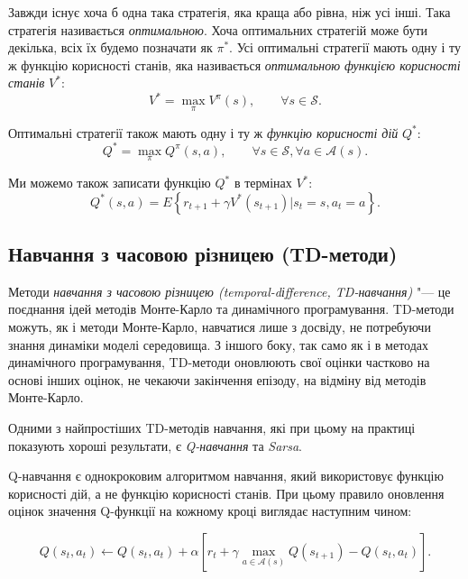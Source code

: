 \documentclass[a4paper,10pt,fleqn]{article}
\begin{document}
Завжди існує хоча б одна така стратегія, яка краща або рівна, ніж усі інші. Така стратегія називається \emph{оптимальною}. Хоча оптимальних стратегій може бути декілька, всіх їх будемо позначати як $\pi^*$. Усі оптимальні стратегії мають одну і ту ж функцію корисності станів, яка називається \emph{оптимальною функцією корисності станів} $V^*$:
\begin{equation}
V^* = \max_\pi V^\pi(s),\qquad \forall s \in \mathcal{S}.
\end{equation}

Оптимальні стратегії також мають одну і ту ж \emph{функцію корисності дій} $Q^*$:
\begin{equation}
Q^* = \max_\pi Q^\pi(s,a),\qquad \forall s \in \mathcal{S}, \forall a \in \mathcal{A}(s).
\end{equation}

Ми можемо також записати функцію $Q^*$ в термінах $V^*$:
\begin{equation}
Q^*(s,a) = E\left\{r_{t+1} + \gamma V^*(s_{t+1}) \Big| s_t=s, a_t=a \right\}.
\end{equation}

\subsection{Навчання з часовою різницею (TD-методи)}

Методи \emph{навчання з часовою різницею (temporal-dіfference, TD-навчання)} "--- це поєднання ідей методів Монте-Карло та динамічного програмування. TD-методи можуть, як і методи Монте-Карло, навчатися лише з досвіду, не потребуючи знання динаміки моделі середовища. З іншого боку, так само як і в методах динамічного програмування, TD-методи оновлюють свої оцінки частково на основі інших оцінок, не чекаючи закінчення епізоду, на відміну від методів Монте-Карло.

Одними з найпростіших TD-методів навчання, які при цьому на практиці показують хороші результати, є \emph{Q-навчання} та \emph{Sarsa}.

Q-навчання є однокроковим алгоритмом навчання, який використовує функцію корисності дій, а не функцію корисності станів. При цьому правило оновлення оцінок значення Q-функції на кожному кроці виглядає наступним чином:

\begin{equation}
Q(s_t,a_t) \leftarrow Q(s_t, a_t) + \alpha \left[ r_t + \gamma \max_{a \in \mathcal{A}(s)} Q(s_{t+1}) - Q(s_t,a_t) \right].
\label{eq:q-update-rule}
\end{equation}
\end{document}
